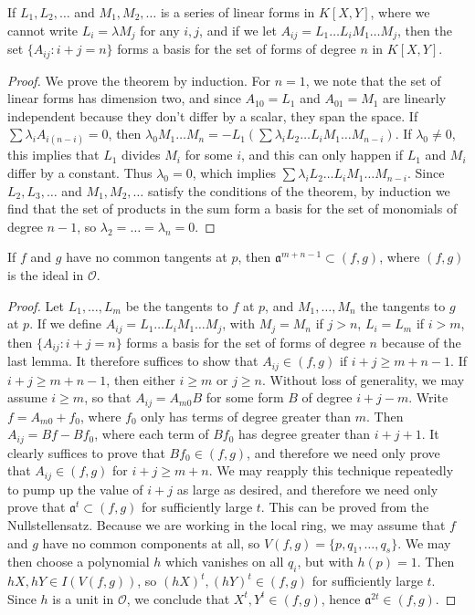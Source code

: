 \begin{lemma}
    If $L_1, L_2, \dots$ and $M_1, M_2, \dots$ is a series of linear forms in $K[X,Y]$, where we cannot write $L_i = \lambda M_j$ for any $i,j$, and if we let $A_{ij} = L_1 \dots L_i M_1 \dots M_j$, then the set $\{ A_{ij} : i + j = n \}$ forms a basis for the set of forms of degree $n$ in $K[X,Y]$.
\end{lemma}
\begin{proof}
    We prove the theorem by induction. For $n = 1$, we note that the set of linear forms has dimension two, and since $A_{10} = L_1$ and $A_{01} = M_1$ are linearly independent because they don't differ by a scalar, they span the space. If $\sum \lambda_i A_{i(n-i)} = 0$, then $\lambda_0 M_1 \dots M_n = -L_1(\sum \lambda_i L_2 \dots L_i M_1 \dots M_{n-i})$. If $\lambda_0 \neq 0$, this implies that $L_1$ divides $M_i$ for some $i$, and this can only happen if $L_1$ and $M_i$ differ by a constant. Thus $\lambda_0 = 0$, which implies $\sum \lambda_i L_2 \dots L_i M_1 \dots M_{n-i}$. Since $L_2, L_3, \dots$ and $M_1, M_2, \dots$ satisfy the conditions of the theorem, by induction we find that the set of products in the sum form a basis for the set of monomials of degree $n-1$, so $\lambda_2 = \dots = \lambda_n = 0$.
\end{proof}

\begin{lemma}
    If $f$ and $g$ have no common tangents at $p$, then $\mathfrak{a}^{m+n-1} \subset (f,g)$, where $(f,g)$ is the ideal in $\mathcal{O}$.
\end{lemma}
\begin{proof}
    Let $L_1, \dots, L_m$ be the tangents to $f$ at $p$, and $M_1, \dots, M_n$ the tangents to $g$ at $p$. If we define $A_{ij} = L_1 \dots L_i M_1 \dots M_j$, with $M_j = M_n$ if $j > n$, $L_i = L_m$ if $i > m$, then $\{ A_{ij}: i + j = n \}$ forms a basis for the set of forms of degree $n$ because of the last lemma. It therefore suffices to show that $A_{ij} \in (f,g)$ if $i + j \geq m + n - 1$. If $i + j \geq m + n - 1$, then either $i \geq m$ or $j \geq n$. Without loss of generality, we may assume $i \geq m$, so that $A_{ij} = A_{m0}B$ for some form $B$ of degree $i + j - m$. Write $f = A_{m0} + f_0$, where $f_0$ only has terms of degree greater than $m$. Then $A_{ij} = Bf - Bf_0$, where each term of $Bf_0$ has degree greater than $i + j + 1$. It clearly suffices to prove that $Bf_0 \in (f,g)$, and therefore we need only prove that $A_{ij} \in (f,g)$ for $i + j \geq m + n$. We may reapply this technique repeatedly to pump up the value of $i + j$ as large as desired, and therefore we need only prove that $\mathfrak{a}^t \subset (f,g)$ for sufficiently large $t$. This can be proved from the Nullstellensatz. Because we are working in the local ring, we may assume that $f$ and $g$ have no common components at all, so $V(f,g) = \{ p, q_1, \dots, q_s \}$. We may then choose a polynomial $h$ which vanishes on all $q_i$, but with $h(p) = 1$. Then $hX, hY \in I(V(f,g))$, so $(hX)^t, (hY)^t \in (f,g)$ for sufficiently large $t$. Since $h$ is a unit in $\mathcal{O}$, we conclude that $X^t, Y^t \in (f,g)$, hence $\mathfrak{a}^{2t} \in (f,g)$.
\end{proof}

